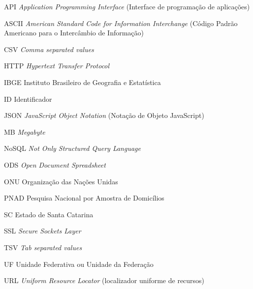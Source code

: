 \begin{siglas}
    \item[API] \textit{Application Programming Interface} (Interface de programação de aplicações)
    \item[ASCII] \textit{American Standard Code for Information Interchange} (Código Padrão Americano para o Intercâmbio de Informação)
    \item[CSV] \textit{Comma separated values}
    \item[HTTP] \textit{Hypertext Transfer Protocol} 
    \item[IBGE] Instituto Brasileiro de Geografia e Estatística
    \item[ID] Identificador
    \item[JSON] \textit{JavaScript Object Notation} (Notação de Objeto JavaScript)
    \item[MB] \textit{Megabyte} 
    \item[NoSQL] \textit{Not Only Structured Query Language}
    \item[ODS] \textit{Open Document Spreadsheet}
    \item[ONU] Organização das Nações Unidas
    \item[PNAD] Pesquisa Nacional por Amostra de Domicílios 
    \item[SC] Estado de Santa Catarina
    \item[SSL] \textit{Secure Sockets Layer}
    \item [TSV] \textit{Tab separated values}
    \item[UF] Unidade Federativa ou Unidade da Federação
    \item[URL] \textit{Uniform Resource Locator} (localizador uniforme de recursos)
  \end{siglas}
  
